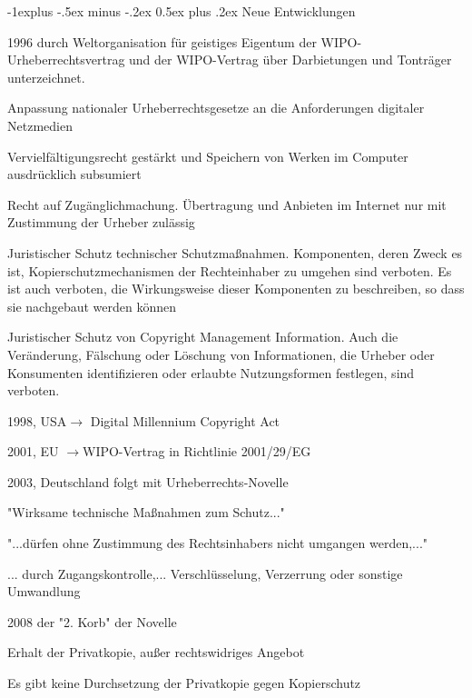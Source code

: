 \documentclass[a4paper]{article}
\makeatletter
\renewcommand{\subsection}{\@startsection{subsection}{2}{0mm}%
                                {-1explus -.5ex minus -.2ex}%
                                {0.5ex plus .2ex}%
                                {\normalfont\normalsize\bfseries}}
\makeatother
\begin{document}
\begin{multicols*}{3}
  \subsection{Neue Entwicklungen}
  \begin{itemize*}
    \item 1996 durch Weltorganisation für geistiges Eigentum der WIPO-Urheberrechtsvertrag und der WIPO-Vertrag über Darbietungen und Tonträger unterzeichnet.
    \begin{itemize*}
      \item Anpassung nationaler Urheberrechtsgesetze an die Anforderungen digitaler Netzmedien
      \item Vervielfältigungsrecht gestärkt und Speichern von Werken im Computer ausdrücklich subsumiert
      \item Recht auf Zugänglichmachung. Übertragung und Anbieten im Internet nur mit Zustimmung der Urheber zulässig
      \item Juristischer Schutz technischer Schutzmaßnahmen. Komponenten, deren Zweck es ist, Kopierschutzmechanismen der Rechteinhaber zu umgehen sind verboten. Es ist auch verboten, die Wirkungsweise dieser Komponenten zu beschreiben, so dass sie nachgebaut werden können
      \item Juristischer Schutz von Copyright Management Information. Auch die Veränderung, Fälschung oder Löschung von Informationen, die Urheber oder Konsumenten identifizieren oder erlaubte Nutzungsformen festlegen, sind verboten.
    \end{itemize*}
    \item 1998, USA$\rightarrow$ Digital Millennium Copyright Act
    \item 2001, EU $\rightarrow$WIPO-Vertrag in Richtlinie 2001/29/EG
    \item 2003, Deutschland folgt mit Urheberrechts-Novelle
    \begin{itemize*}
      \item "Wirksame technische Maßnahmen zum Schutz..."
      \item "...dürfen ohne Zustimmung des Rechtsinhabers nicht umgangen werden,..."
      \item ... durch Zugangskontrolle,... Verschlüsselung, Verzerrung oder sonstige Umwandlung
    \end{itemize*}
    \item 2008 der "2. Korb" der Novelle
    \begin{itemize*}
      \item Erhalt der Privatkopie, außer rechtswidriges Angebot
      \item Es gibt keine Durchsetzung der Privatkopie gegen Kopierschutz
    \end{itemize*}
  \end{itemize*}


\end{multicols*}
\end{document}
